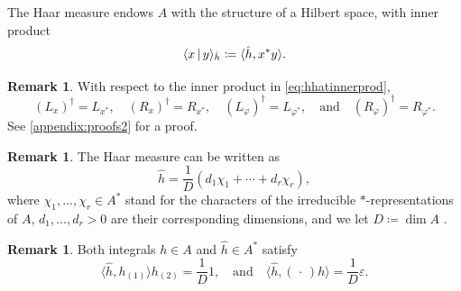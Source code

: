 \documentclass[a4paper,10pt]{amsart}
\newcommand{\eval}[2]{\langle #1 , #2\rangle}
\newcommand{\innerprod}[2]{\langle #1 \,|\, #2\rangle_{\smash{\hat{h}}}}
\newcommand{\placeholder}{\,\cdot\,}
\theoremstyle{definition}
\newtheorem{remark}[theorem]{Remark}
\begin{document}
The Haar measure endows $A$ with the structure of a Hilbert space, with inner product
\begin{equation}\label{eq:hhatinnerprod}
    \innerprod{x}{y} \coloneqq \eval{\hat{h}}{x^* y}.
\end{equation}


\begin{remark}\label{rem:DaggerLR}
    With respect to the inner product in \cref{eq:hhatinnerprod},
    \[
        (L_x)^\dagger = L_{x^*},\quad (R_x)^\dagger = R_{x^*},\quad (L_\varphi)^\dagger = L_{\varphi^*},\quad\text{and}\quad (R_\varphi)^\dagger = R_{\varphi^*}.
    \]
    See \cref{appendix:proofs2} for a proof.
\end{remark}

\begin{remark}
The Haar measure can be written as
\begin{equation*}
    \hat{h}
    =
    \frac{1}{D} (d_1 \chi_1 + \cdots + d_r \chi_r),
\end{equation*}
where $\chi_1,\ldots,\chi_r\in A^*$ stand for the characters of the irreducible $*$-re\-pre\-sen\-ta\-tions of $A$, $d_1,\ldots,d_r>0$ are their corresponding dimensions, and we let $D  \coloneqq  \dim A$ \cite{montgomery_representation_2001, bohm_weak_2000,etingof_tensor_2015,molnar_matrix_2022}.
\end{remark}

\begin{remark}
Both integrals $h\in A$ and $\hat{h}\in A^*$ satisfy
\begin{equation}\label{eq:DualInt}
	\eval{\hat{h}}{h_{(1)}}h_{(2)} = \frac{1}{D} 1
    ,\quad\text{and}\quad
    \eval{\hat{h}}{(\placeholder)h} = \frac{1}{D} \varepsilon.
\end{equation}
\end{remark}
\end{document}
